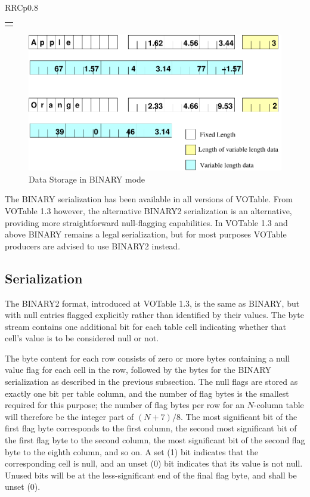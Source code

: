 \begin{tabular}{RRCp{0.8\textwidth}}
\begin{center}
{\label{Image2}
\ifhtx\begin{tabular}{c}
\tag{IMG SRC="binary.png" NAME="Image2" ALIGN=LEFT BORDER=0}\end{tabular}
\else\begin{center}
\begin{figure}[htb]
\includegraphics[width=\textwidth]{binary.pdf}
\caption{\label{fig:bin}Data Storage in BINARY mode}
\end{figure}\end{center}
\fi

The BINARY serialization has been available in all versions of VOTable.
From VOTable 1.3 however, the alternative BINARY2 serialization is
an alternative, providing more straightforward null-flagging capabilities.
In VOTable 1.3 and above BINARY remains a legal serialization, but for most
purposes VOTable producers are advised to use BINARY2 instead.

\subsection{\texorpdfstring{ Serialization}
                           {BINARY2 Serialization}}
\label{sec:BIN2}

The BINARY2 format, introduced at VOTable 1.3, is the same as BINARY,
but with null entries flagged explicitly rather than identified
by their values.
The byte stream contains one additional bit for each table cell
indicating whether that cell's value is to be considered null or not.

The byte content for each row consists of
zero or more bytes containing a null value flag for each cell in the row,
followed by the bytes for the BINARY serialization as described in the
previous subsection.
The null flags are stored as exactly one bit per table column, and the number
of flag bytes is the smallest required for this purpose;
the number of flag bytes per row for an $N$-column table will therefore
be the integer part of  $(N+7)/8$.
The most significant bit of the first flag byte corresponds to the
first column,
the second most significant bit of the first flag byte to the second column,
the most significant bit of the second flag byte to the eighth column,
and so on.  A set (1) bit indicates that the corresponding cell is null,
and an unset (0) bit indicates that its value is not null.
Unused bits will be at the less-significant end of the final flag byte,
and shall be unset (0).

}
\end{center}
\end{tabular}
